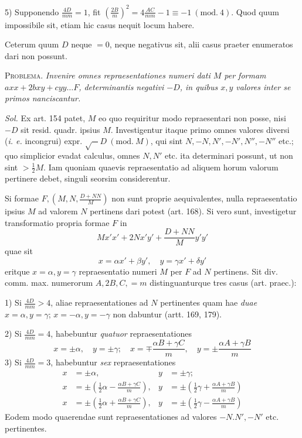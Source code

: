 5) Supponendo $\frac{4D}{mm}=1$, fit $(\frac{2B}{m})^2=4\frac{AC}{mm}-1\equiv-1\ (\mathrm{mod.}\ 4)$. Quod quum impossibile sit, etiam hic casus nequit locum habere.

Ceterum quum $D$ neque $=0$, neque negativus sit, alii casus praeter enumeratos dari non possunt.

\textsc{Problema.} \textit{Invenire omnes repraesentationes numeri dati $M$ per formam $axx+2bxy+cyy\ldots F$, determinantis negativi $-D$, in quibus $x,y$ valores inter se primos nanciscantur.}

\textit{Sol.} Ex art. 154 patet, $M$ eo quo requiritur modo repraesentari non posse, nisi $-D$ sit resid. quadr. ipsius $M$. Investigentur itaque primo omnes valores diversi (\textit{i. e.} incongrui) expr. $\surd-D\ (\mathrm{mod.}\ M)$, qui sint $N,-N,N',-N',N'',-N''$ etc.; quo simplicior evadat calculus, omnes $N,N'$ etc. ita determinari possunt, ut non sint $>\tfrac12M$. Iam quoniam quaevis repraesentatio ad aliquem horum valorum pertinere debet, singuli seorsim considerentur.

Si formae $F,(M,N,\frac{D+NN}{M})$ non sunt proprie aequivalentes, nulla repraesentatio ipsius $M$ ad valorem $N$ pertinens dari potest (art. 168). Si vero sunt, investigetur transformatio propria formae $F$ in
\[
Mx'x'+2Nx'y'+\frac{D+NN}{M}y'y'
\]
quae sit
\[
x=\alpha x'+\beta y',\quad y=\gamma x'+\delta y'
\]
eritque $x=\alpha,y=\gamma$ repraesentatio numeri $M$ per $F$ ad $N$ pertinens. Sit div. comm. max. numerorum $A,2B,C,=m$ distinguanturque tres casus (art. praec.):

1) Si $\frac{4D}{mm}>4$, aliae repraesentationes ad $N$ pertinentes quam hae \textit{duae} $x=\alpha,y=\gamma$; $x=-\alpha,y=-\gamma$ non dabuntur (artt. 169, 179).

2) Si $\frac{4D}{mm}=4$, habebuntur \textit{quatuor} repraesentationes
\[
x=\pm\alpha,\quad y=\pm\gamma;\quad x=\mp\frac{\alpha B+\gamma C}{m},\quad y=\pm\frac{\alpha A+\gamma B}{m}
\]
3) Si $\frac{4D}{mm}=3$, habebuntur \textit{sex} repraesentationes
\[
\begin{aligned}
x&=\pm\alpha,&y&=\pm\gamma;\\
x&=\pm(\tfrac12\alpha-\tfrac{\alpha B+\gamma C}{m}),&y&=\pm(\tfrac12\gamma+\tfrac{\alpha A+\gamma B}{m})\\
x&=\pm(\tfrac12\alpha+\tfrac{\alpha B+\gamma C}{m}),&y&=\pm(\tfrac12\gamma-\tfrac{\alpha A+\gamma B}{m})
\end{aligned}
\]
Eodem modo quaerendae sunt repraesentationes ad valores $-N.N',-N'$ etc. pertinentes.

